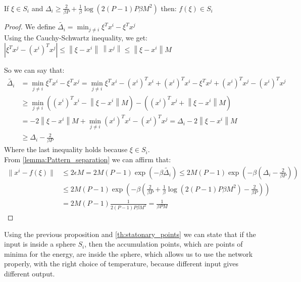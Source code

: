 \begin{proposition}\\
	\label{prop:local_conv}
	If $\xi \in S_i$ and $\Delta_i \geq \frac{2}{\beta P} + \frac{1}{\beta} \log(2(P-1)P \beta M^2)$ then: $f(\xi) \in S_i$
	\begin{proof}
		We define $\widetilde{\Delta_i}= \min_{j\neq i} \xi^Tx^i - \xi^T x^j$\\
		Using the  Cauchy-Schwartz inequality, we get: $\left|\xi^Tx^j - (x^i)^Tx^j\right| \leq \left\|\xi - x^i\right\|\, \left\|x^j\right\| \leq \left\|\xi - x^i\right\| M$

		\noindent So we can say that:
		\begin{align*}
			\widetilde{\Delta_i} &= \min_{j\neq i} \xi^Tx^i - \xi^T x^j =  \min_{j\neq i} \xi^Tx^i -\left(x^i\right)^Tx^i + \left(x^i\right)^Tx^i  -\xi^Tx^j + \left(x^i\right)^Tx^j - \left(x^i\right)^Tx^j \\
			&\geq \min_{j\neq i} \left(\left(x^i\right)^Tx^i - \left\|\xi - x^i\right\| M\right) - \left(\left(x^i\right)^Tx^j +\left\|\xi - x^i\right\| M\right) \\
			&= -2\left\|\xi -x^i\right\|M +  \min_{j\neq i} \left(x^i\right)^Tx^i - \left(x^i\right)^Tx^j = \Delta_i - 2\left\|\xi -x^i\right\|M  \\
			& \geq \Delta_i - \frac{2}{\beta P}
		\end{align*}
		Where the last inequality holds because  $\xi \in S_i$.\\
		From \cref{lemma:Pattern_separation} we can affirm that:
		\begin{align*}
			\|x^i - f(\xi)\| &\leq 2 \epsilon M = 2 M (P-1) \exp\left(-\beta \widetilde{\Delta_i}\right) \leq  2 M (P-1) \exp\left(-\beta \left(\Delta_i - \frac{2}{\beta P}\right)\right) \\
			&\leq 2 M \left(P-1\right) \exp\left(-\beta \left( \frac{2}{\beta P} + \frac{1}{\beta} \log\left(2\left(P-1\right)P \beta M^2\right) - \frac{2}{\beta P}\right)\right)\\
			&=  2 M \left(P-1\right) \frac{1}{2\left(P-1\right)P \beta M^2} = \frac{1}{\beta P  M}
		\end{align*}
	\end{proof}
\end{proposition}
Using the previous proposition and \cref{th:statonary_points} we can state that if the input is inside a sphere $S_i$, then the accumulation points, which are points of minima for the energy, are inside the sphere, which allows us to use the network properly, with the right choice of temperature, because different input gives different output.
